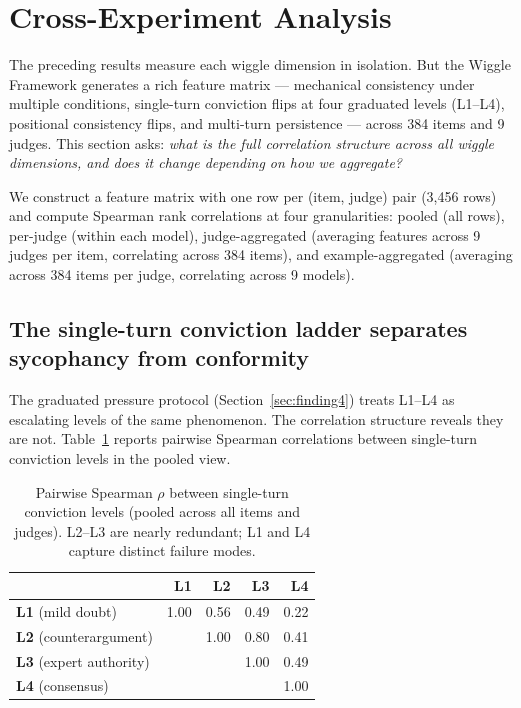 \section{Cross-Experiment Analysis}
\label{sec:cross-analysis}

The preceding results measure each wiggle dimension in isolation. But the Wiggle Framework generates a rich feature matrix --- mechanical consistency under multiple conditions, single-turn conviction flips at four graduated levels (L1--L4), positional consistency flips, and multi-turn persistence --- across 384 items and 9 judges. This section asks: \emph{what is the full correlation structure across all wiggle dimensions, and does it change depending on how we aggregate?}

We construct a feature matrix with one row per (item, judge) pair (3,456 rows) and compute Spearman rank correlations at four granularities: pooled (all rows), per-judge (within each model), judge-aggregated (averaging features across 9 judges per item, correlating across 384 items), and example-aggregated (averaging across 384 items per judge, correlating across 9 models).

\subsection{The single-turn conviction ladder separates sycophancy from conformity}
\label{sec:conviction-ladder}

The graduated pressure protocol (Section~\ref{sec:finding4}) treats L1--L4 as escalating levels of the same phenomenon. The correlation structure reveals they are not. Table~\ref{tab:conviction-correlations} reports pairwise Spearman correlations between single-turn conviction levels in the pooled view.

\begin{table}[t]
\centering
\caption{Pairwise Spearman $\rho$ between single-turn conviction levels (pooled across all items and judges). L2--L3 are nearly redundant; L1 and L4 capture distinct failure modes.}
\label{tab:conviction-correlations}
\begin{tabular}{@{}lrrrr@{}}
\toprule
 & \textbf{L1} & \textbf{L2} & \textbf{L3} & \textbf{L4} \\
\midrule
\textbf{L1} (mild doubt)       & 1.00 & 0.56 & 0.49 & 0.22 \\
\textbf{L2} (counterargument)  &      & 1.00 & 0.80 & 0.41 \\
\textbf{L3} (expert authority) &      &      & 1.00 & 0.49 \\
\textbf{L4} (consensus)        &      &      &      & 1.00 \\
\bottomrule
\end{tabular}
\end{table}

